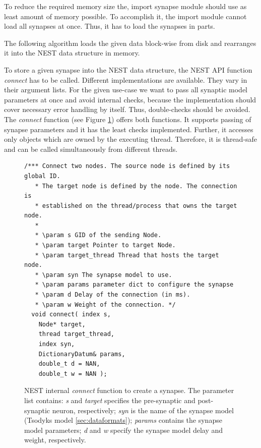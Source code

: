 To reduce the required memory size the, import synapse module should use as least amount of memory possible.
To accomplish it, the import module cannot load all synapses at once.
Thus, it has to load the synapses in parts.

The following algorithm loads the given data block-wise from disk and rearranges it into
the NEST data structure in memory.

To store a given synapse into the NEST data structure,
the NEST API function \emph{connect} has to be called.  
Different implementations are available. They vary in their argument lists.
For the given use-case we want to pass all synaptic model parameters at once and
avoid internal checks, because the implementation should cover necessary error handling by 
itself. Thus, double-checks should be avoided.
The \emph{connect} function (see Figure \ref{code:connect}) offers both functions.
It supports passing of synapse parameters and it has the least checks implemented.
Further, it accesses only objects which are owned by the executing thread. 
Therefore, it is thread-safe and can be called simultaneously from different threads.
\begin{figure}[ht!]
\begin{lstlisting}[style=cppcode]
/*** Connect two nodes. The source node is defined by its global ID.
   * The target node is defined by the node. The connection is
   * established on the thread/process that owns the target node.
   *
   * \param s GID of the sending Node.
   * \param target Pointer to target Node.
   * \param target_thread Thread that hosts the target node.
   * \param syn The synapse model to use.
   * \param params parameter dict to configure the synapse
   * \param d Delay of the connection (in ms).
   * \param w Weight of the connection. */
  void connect( index s,
    Node* target,
    thread target_thread,
    index syn,
    DictionaryDatum& params,
    double_t d = NAN,
    double_t w = NAN );
\end{lstlisting}
\caption[NEST internal \emph{connect} function to create a synapse]{NEST internal \emph{connect} function to create a synapse. The parameter list contains:
\emph{s} and \emph{target} specifies the pre-synaptic and post-synaptic neuron, respectively;
\emph{syn} is the name of the synapse model (Tsodyks model \ref{sec:dataformats});
\emph{params} contains the synapse model parameters;
\emph{d} and \emph{w} specify the synapse model delay and weight, respectively.}
\label{code:connect}
\end{figure}

